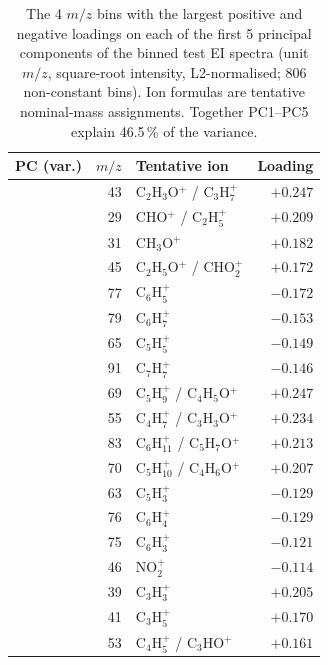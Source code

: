 \begin{table}[htbp]
\centering
\small
\caption{The 4 $m/z$ bins with the largest positive and negative loadings on each of the first 5 principal components of the binned test EI spectra (unit $m/z$, square-root intensity, L2-normalised; 806 non-constant bins). Ion formulas are tentative nominal-mass assignments. Together PC1--PC5 explain 46.5\,\% of the variance.}
\label{tab:spectral_pca_loadings}
\begin{tabular}{l r l r}
\toprule
PC (var.) & $m/z$ & Tentative ion & Loading \\
\midrule
{} & 43 & C$_{2}$H$_{3}$O$^{+}$ / C$_{3}$H$_{7}^{+}$ & $+0.247$ \\
 & 29 & CHO$^{+}$ / C$_{2}$H$_{5}^{+}$ & $+0.209$ \\
 & 31 & CH$_{3}$O$^{+}$ & $+0.182$ \\
 & 45 & C$_{2}$H$_{5}$O$^{+}$ / CHO$_{2}^{+}$ & $+0.172$ \\
 & 77 & C$_{6}$H$_{5}^{+}$ & $-0.172$ \\
 & 79 & C$_{6}$H$_{7}^{+}$ & $-0.153$ \\
 & 65 & C$_{5}$H$_{5}^{+}$ & $-0.149$ \\
 & 91 & C$_{7}$H$_{7}^{+}$ & $-0.146$ \\
\midrule
{} & 69 & C$_{5}$H$_{9}^{+}$ / C$_{4}$H$_{5}$O$^{+}$ & $+0.247$ \\
 & 55 & C$_{4}$H$_{7}^{+}$ / C$_{3}$H$_{3}$O$^{+}$ & $+0.234$ \\
 & 83 & C$_{6}$H$_{11}^{+}$ / C$_{5}$H$_{7}$O$^{+}$ & $+0.213$ \\
 & 70 & C$_{5}$H$_{10}^{+}$ / C$_{4}$H$_{6}$O$^{+}$ & $+0.207$ \\
 & 63 & C$_{5}$H$_{3}^{+}$ & $-0.129$ \\
 & 76 & C$_{6}$H$_{4}^{+}$ & $-0.129$ \\
 & 75 & C$_{6}$H$_{3}^{+}$ & $-0.121$ \\
 & 46 & NO$_{2}^{+}$ & $-0.114$ \\
\midrule
{} & 39 & C$_{3}$H$_{3}^{+}$ & $+0.205$ \\
 & 41 & C$_{3}$H$_{5}^{+}$ & $+0.170$ \\
 & 53 & C$_{4}$H$_{5}^{+}$ / C$_{3}$HO$^{+}$ & $+0.161$ \\

\end{tabular}
\end{table}
